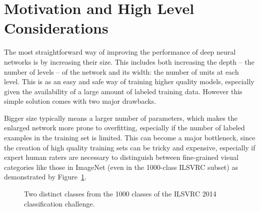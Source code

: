 \section{Motivation and High Level Considerations}

The most straightforward way of improving the performance of deep neural networks is by increasing their size. This includes both increasing the depth -- the number of levels -- of the network and its width: the number of units at each level. This is as an easy and safe way of training higher quality models, especially given the availability of a large amount of labeled training data. However this simple solution comes with two major drawbacks. 

Bigger size typically means a larger number of parameters, which makes the enlarged network more prone to overfitting, especially if the number of labeled examples in the training set is limited. This can become a major bottleneck, since the creation of high quality training sets can be tricky and expensive, especially if expert human raters are necessary to distinguish between fine-grained visual categories like those in ImageNet (even in the 1000-class ILSVRC subset) as demonstrated by Figure~\ref{fig:finegrained}.

\begin{figure}
\centering
{}
\caption{Two distinct classes from the 1000 classes of the ILSVRC 2014 classification challenge.}
\label{fig:finegrained}
\end{figure}

